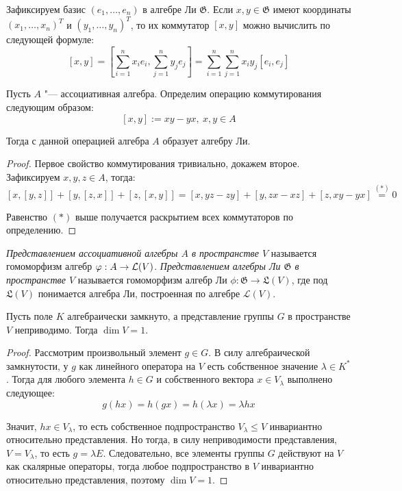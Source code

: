 \begin{note}
	Зафиксируем базис $(e_1, \dotsc, e_n)$ в алгебре Ли $\mathfrak G$. Если $x, y \in \mathfrak G$ имеют координаты $(x_1, \dotsc, x_n)^T$ и $(y_1, \dotsc, y_n)^T$, то их коммутатор $[x, y]$ можно вычислить по следующей формуле:
	\[[x, y] = \left[\sum_{i=1}^nx_ie_i, \sum_{j=1}^ny_je_j\right] = \sum_{i=1}^n\sum_{j=1}^nx_iy_j[e_i, e_j]\]
\end{note}

\begin{proposition}
	Пусть $A$ "--- ассоциативная алгебра. Определим операцию коммутирования следующим образом:
	\[[x, y] := xy - yx,~x, y \in A\]
	
	Тогда с данной операцией алгебра $A$ образует алгебру Ли.
\end{proposition}

\begin{proof}
	Первое свойство коммутирования тривиально, докажем второе. Зафиксируем $x, y, z \in A$, тогда:
	\[[x, [y, z]] + [y, [z, x]] + [z, [x, y]] = [x, yz - zy] + [y, zx - xz] + [z, xy - yx] \stackrel{(*)}{=} 0\]
	
	Равенство $(*)$ выше получается раскрытием всех коммутаторов по определению.
\end{proof}

\begin{definition}
	\textit{Представлением ассоциативной алгебры $A$ в пространстве $V$} называется гомоморфизм алгебр $\varphi : A \to \mathcal L(V)$. \textit{Представлением алгебры Ли $\mathfrak G$ в пространстве $V$} называется гомоморфизм алгебр Ли $\phi : \mathfrak{G} \to \mathfrak{L}(V)$, где под $\mathfrak{L}(V)$ понимается алгебра Ли, построенная по алгебре $\mathcal L(V)$.
\end{definition}

\begin{proposition}
	Пусть поле $K$ алгебраически замкнуто, а представление группы $G$ в пространстве $V$ неприводимо. Тогда $\dim {V} = 1$.
\end{proposition}

\begin{proof}
	Рассмотрим произвольный элемент $g \in G$. В силу алгебраической замкнутости, у $g$ как линейного оператора на $V$ есть собственное значение $\lambda \in K^*$. Тогда для любого элемента $h \in G$ и собственного вектора $x \in V_{\lambda}$ выполнено следующее:
	\[g(hx) = h(gx) = h(\lambda x) = \lambda hx\]
	
	Значит, $hx \in V_{\lambda}$, то есть собственное подпространство $V_{\lambda} \le V$ инвариантно относительно представления. Но тогда, в силу неприводимости представления, $V = V_{\lambda}$, то есть $g = \lambda E$. Следовательно, все элементы группы $G$ действуют на $V$ как скалярные операторы, тогда любое подпространство в $V$ инвариантно относительно представления, поэтому $\dim{V} = 1$.
\end{proof}


